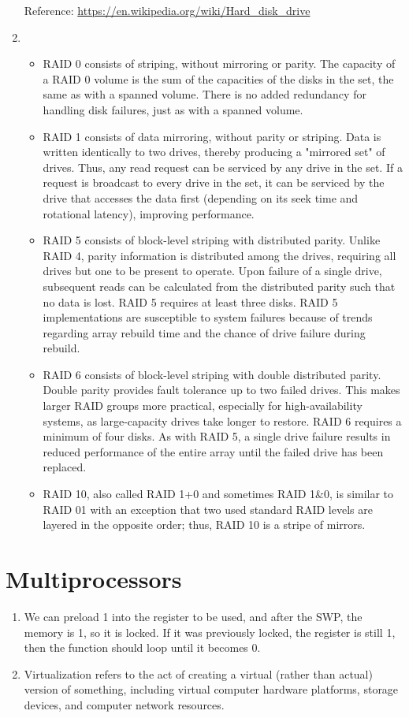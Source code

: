 \documentclass{article}
\begin{document}
\begin{enumerate}
Reference: \url{https://en.wikipedia.org/wiki/Hard_disk_drive}
\item
\begin{itemize}
\item RAID 0 consists of striping, without mirroring or parity. The capacity of a RAID 0 volume is the sum of the capacities of the disks in the set, the same as with a spanned volume. There is no added redundancy for handling disk failures, just as with a spanned volume. 
\item RAID 1 consists of data mirroring, without parity or striping. Data is written identically to two drives, thereby producing a "mirrored set" of drives. Thus, any read request can be serviced by any drive in the set. If a request is broadcast to every drive in the set, it can be serviced by the drive that accesses the data first (depending on its seek time and rotational latency), improving performance. 
\item RAID 5 consists of block-level striping with distributed parity. Unlike RAID 4, parity information is distributed among the drives, requiring all drives but one to be present to operate. Upon failure of a single drive, subsequent reads can be calculated from the distributed parity such that no data is lost. RAID 5 requires at least three disks. RAID 5 implementations are susceptible to system failures because of trends regarding array rebuild time and the chance of drive failure during rebuild.
\item RAID 6 consists of block-level striping with double distributed parity. Double parity provides fault tolerance up to two failed drives. This makes larger RAID groups more practical, especially for high-availability systems, as large-capacity drives take longer to restore. RAID 6 requires a minimum of four disks. As with RAID 5, a single drive failure results in reduced performance of the entire array until the failed drive has been replaced.
\item RAID 10, also called RAID 1+0 and sometimes RAID 1\&0, is similar to RAID 01 with an exception that two used standard RAID levels are layered in the opposite order; thus, RAID 10 is a stripe of mirrors.
\end{itemize}
\end{enumerate}

\section{Multiprocessors}
\begin{enumerate}
\item
We can preload 1 into the register to be used, and after the SWP, the memory is 1, so it is locked. If it was previously locked, the register is still 1, then the function should loop until it becomes 0.
\item
Virtualization refers to the act of creating a virtual (rather than actual) version of something, including virtual computer hardware platforms, storage devices, and computer network resources.


\end{enumerate}
\end{document}
